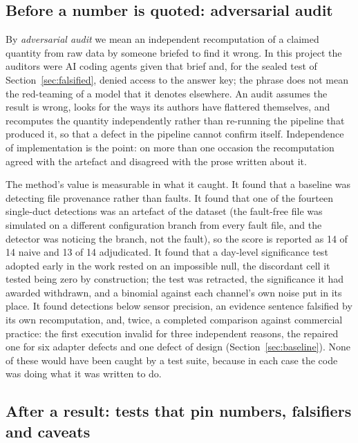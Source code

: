 \documentclass[11pt,letterpaper]{article}
\begin{document}
\subsection{Before a number is quoted: adversarial audit}

By \emph{adversarial audit} we mean an independent recomputation of a claimed quantity from raw data by someone briefed to find it wrong. In this project the auditors were AI coding agents given that brief and, for the sealed test of Section~\ref{sec:falsified}, denied access to the answer key; the phrase does not mean the red-teaming of a model that it denotes elsewhere. An audit assumes the result is wrong, looks for the ways its authors have flattered themselves, and recomputes the quantity independently rather than re-running the pipeline that produced it, so that a defect in the pipeline cannot confirm itself. Independence of implementation is the point: on more than one occasion the recomputation agreed with the artefact and disagreed with the prose written about it.

The method's value is measurable in what it caught. It found that a baseline was detecting file provenance rather than faults. It found that one of the fourteen single-duct detections was an artefact of the dataset (the fault-free file was simulated on a different configuration branch from every fault file, and the detector was noticing the branch, not the fault), so the score is reported as 14 of 14 naive and 13 of 14 adjudicated. It found that a day-level significance test adopted early in the work rested on an impossible null, the discordant cell it tested being zero by construction; the test was retracted, the significance it had awarded withdrawn, and a binomial against each channel's own noise put in its place. It found detections below sensor precision, an evidence sentence falsified by its own recomputation, and, twice, a completed comparison against commercial practice: the first execution invalid for three independent reasons, the repaired one for six adapter defects and one defect of design (Section~\ref{sec:baseline}). None of these would have been caught by a test suite, because in each case the code was doing what it was written to do.

\subsection{After a result: tests that pin numbers, falsifiers and caveats}
\end{document}
